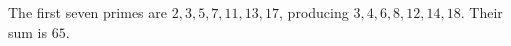 The first seven primes are $2,3,5,7,11,13,17$, producing $3,4,6,8,12,14,18$. Their sum is $\boxed{65}$.
